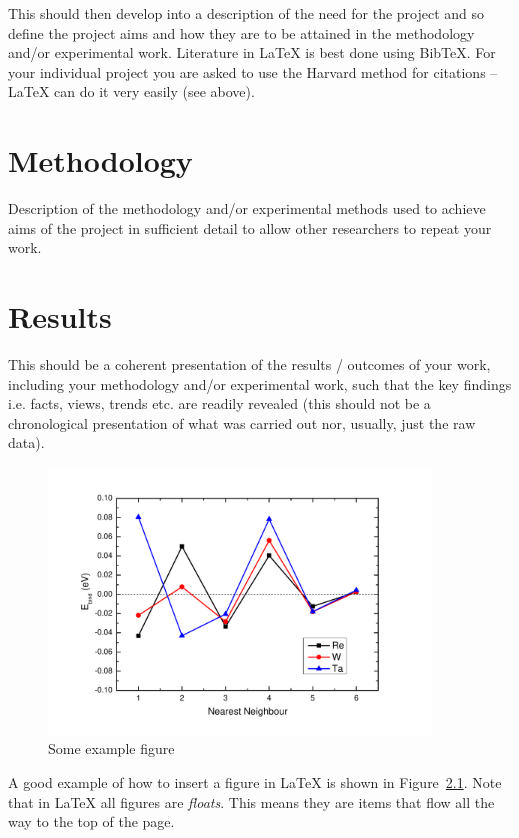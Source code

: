 \documentclass[12pt, letterpaper]{memoir}
\newcommand{\figref}[1]{Figure~\ref{#1}}
\begin{document}
This should then develop into a description of the need for the project and so define the
project aims and how they are to be attained in the methodology and/or experimental work. Literature in \LaTeX{}  is best done using BibTeX. For your individual project you are asked to use the Harvard method for citations -- \LaTeX{} can do it very easily (see above).





\chapter{Methodology}
Description of the methodology and/or experimental methods used to achieve aims of the project in sufficient detail to allow other researchers to repeat your work.





\chapter{Results}
This should be a coherent presentation of the results / outcomes of your work, including your methodology and/or experimental work, such that the key findings i.e. facts, views, trends etc. are readily revealed (this should not be a chronological presentation of what was carried out nor, usually, just the raw data).

\begin{figure}[htbt]
\begin{center}
\includegraphics[width=4in]{Pics/examplefig}
\caption{Some example figure}
\label{examplefig}
\end{center}
\end{figure}

A good example of how to insert a figure in \LaTeX{} is shown in \figref{examplefig}. Note that in \LaTeX{} all figures are \emph{floats}. This means they are items that flow all the way to the top of the page.
\end{document}
